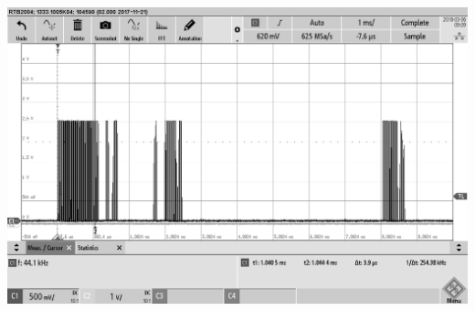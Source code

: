 \begin{minipage}{0.5\textwidth}
\includegraphics[width=1\textwidth, draft]{Abbildungen/Messungen4,6V/MURATAsr1,5m.png}
\label{fig:EKULIT1,5m}
\end{minipage}


